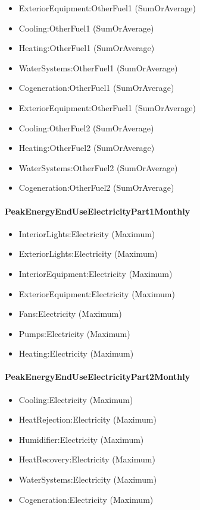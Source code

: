 \begin{itemize}
\item
  ExteriorEquipment:OtherFuel1 (SumOrAverage)
\item
  Cooling:OtherFuel1 (SumOrAverage)
\item
  Heating:OtherFuel1 (SumOrAverage)
\item
  WaterSystems:OtherFuel1 (SumOrAverage)
\item
  Cogeneration:OtherFuel1 (SumOrAverage)
\item
  ExteriorEquipment:OtherFuel1 (SumOrAverage)
\item
  Cooling:OtherFuel2 (SumOrAverage)
\item
  Heating:OtherFuel2 (SumOrAverage)
\item
  WaterSystems:OtherFuel2 (SumOrAverage)
\item
  Cogeneration:OtherFuel2 (SumOrAverage)
\end{itemize}

\paragraph{PeakEnergyEndUseElectricityPart1Monthly}\label{peakenergyenduseelectricitypart1monthly}

\begin{itemize}
\item
  InteriorLights:Electricity (Maximum)
\item
  ExteriorLights:Electricity (Maximum)
\item
  InteriorEquipment:Electricity (Maximum)
\item
  ExteriorEquipment:Electricity (Maximum)
\item
  Fans:Electricity (Maximum)
\item
  Pumps:Electricity (Maximum)
\item
  Heating:Electricity (Maximum)
\end{itemize}

\paragraph{PeakEnergyEndUseElectricityPart2Monthly}\label{peakenergyenduseelectricitypart2monthly}

\begin{itemize}
\item
  Cooling:Electricity (Maximum)
\item
  HeatRejection:Electricity (Maximum)
\item
  Humidifier:Electricity (Maximum)
\item
  HeatRecovery:Electricity (Maximum)
\item
  WaterSystems:Electricity (Maximum)
\item
  Cogeneration:Electricity (Maximum)
\end{itemize}

